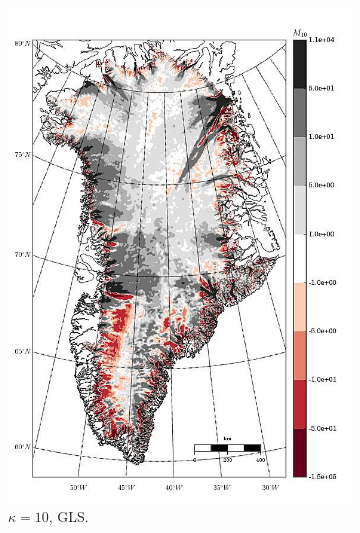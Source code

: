 \begin{figure}
  \begin{subfigure}[b]{0.25\linewidth}
    \includegraphics[width=\linewidth]{images/balance_velocity/greenland/misfit_5H_kappa_10_GLS.jpg}
  \caption{$\kappa = 10$, GLS.}
  \label{greenland_bv_image_kappa_10_GLS_misfit}
  \end{subfigure}
  \begin{subfigure}[b]{0.25\linewidth}

\end{subfigure}
\end{figure}
